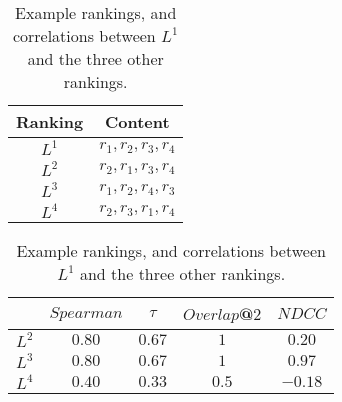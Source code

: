 \begin{table}
  \begin{center}
    \begin{tabular}{c|c}
      Ranking & Content\\
      \hline
      $L^1$& $r_1,r_2,r_3,r_4$ \\
      $L^2$& $r_2,r_1,r_3,r_4$ \\
      $L^3$& $r_1,r_2,r_4,r_3$  \\
      $L^4$& $r_2,r_3,r_1,r_4$ \\
    \end{tabular}
    \begin{tabular}{c|c|c|c|c}
      &$\mathit{Spearman}$&$\tau$&$\mathit{Overlap}$@$2$&$\mathit{NDCC}$\\
      \hline
      $L^2$&$0.80$&$0.67$&$1$&$0.20$\\
      $L^3$&$0.80$&$0.67$&$1$&$0.97$\\
      $L^4$&$0.40$&$0.33$&$0.5$&$-0.18$\\
    \end{tabular}
    \caption{Example rankings,
      and correlations between $L^1$ and the three other rankings.
    \label{tab:exampleranks}}
  \end{center}
\end{table}
